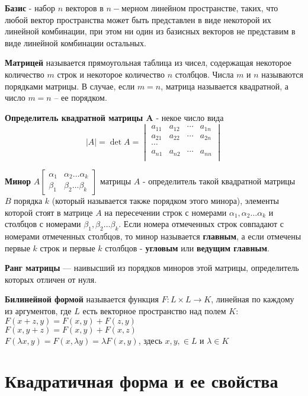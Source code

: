 \documentclass[bachelor, och, coursework, times]{SCWorks}
\newcommand\tab[1][1cm]{\hspace*{#1}}
\begin{document}
\textbf{Базис} - набор $n$ векторов в $n-$мерном линейном пространстве, таких, что любой вектор пространства может быть представлен в виде некоторой их линейной комбинации, при этом ни один из базисных векторов не представим в виде линейной комбинации остальных. 

\textbf{Матрицей} называется прямоугольная таблица из чисел, содержащая некоторое количество $m$ строк и некоторое количество $n$ столбцов. Числа $m$ и $n$ называются порядками матрицы. В случае, если $m = n$, матрица называется квадратной, а число $m= n$ – ее порядком.

\textbf{Определитель квадратной матрицы A} - некое число вида $$|A|=\det A=\begin{vmatrix}
a_{11} & a_{12} & \cdots & a_{1n} \\ 
a_{21} & a_{22} & \cdots & a_{2n} \\ 
\cdots \\
a_{n1} & a_{n2} & \cdots & a_{nn} \\ 
\end{vmatrix}
$$

\textbf{Минор} $A \begin{bmatrix} \alpha_1 & \alpha_2 \dots \alpha_k \\ \beta_1 & \beta_2 \dots \beta_k \end{bmatrix}$ матрицы $A$ - определитель такой квадратной матрицы $B$ порядка $k$ (который называется также порядком этого минора), элементы которой стоят в матрице $A$ на пересечении строк с номерами $\alpha_1, \alpha_2 \dots \alpha_k$ и столбцов с номерами $\beta_1, \beta_2 \dots \beta_k$.\newline
Если номера отмеченных строк совпадают с номерами отмеченных столбцов, то минор называется \textbf{главным}, а если отмечены первые $k$ строк и первые $k$ столбцов - \textbf{угловым} или \textbf{ведущим главным}.

\textbf{Ранг матрицы} — наивысший из порядков миноров этой матрицы, определитель которых отличен от нуля.

\textbf{Билинейной формой} называется функция $F:L \times L \to K$, линейная по каждому из аргументов, где $L$ есть векторное пространство над полем $K$: \\
\tab $F(x+z,y)=F(x,y)+F(z,y)$ \\
\tab $F(x,y+z)=F(x,y)+F(x,z)$ \\
\tab $F(\lambda x,y)= F(x,\lambda y) = \lambda F(x,y)$, здесь $x,y,\in L$ и $\lambda \in K$


\section{Квадратичная форма и ее свойства}
\end{document}
